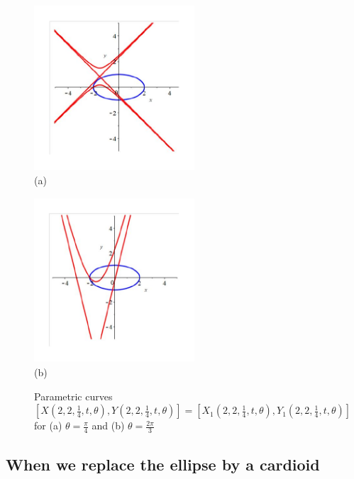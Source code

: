 \documentclass[12pt,a4paper]{article}%
\begin{document}
\begin{figure}[htpb]
\begin{center}
\parbox[b]{2.5in}{\begin{center}
\includegraphics[natheight=2.877400in,natwidth=2.785100in,height=2.4294in,width=2.3523in]{PJH75I1O.pdf}
 \\ (a)
\end{center}}
\qquad
\parbox[b]{2.5in}{\begin{center}
\includegraphics[natheight=2.970500in,natwidth=2.877400in,height=2.4294in,width=2.3549in]{PJH75I1P.pdf}
 \\ (b)
\end{center}}
\end{center}
\caption{Parametric curves $[X(2,2,\frac{1}{4},t,\theta), Y(2,2,\frac{1}{4},t,\theta)] 
                                          = [X_1(2,2,\frac{1}{4},t,\theta), Y_1(2,2,\frac{1}{4},t,\theta)]$
              for (a) $\theta=\frac{\pi}{4}$ and (b) $\theta=\frac{2\pi}{3}$}
\label{fig12}
\end{figure}

\subsection{When we replace the ellipse by a cardioid} \label{ssec4-1}
\end{document}

